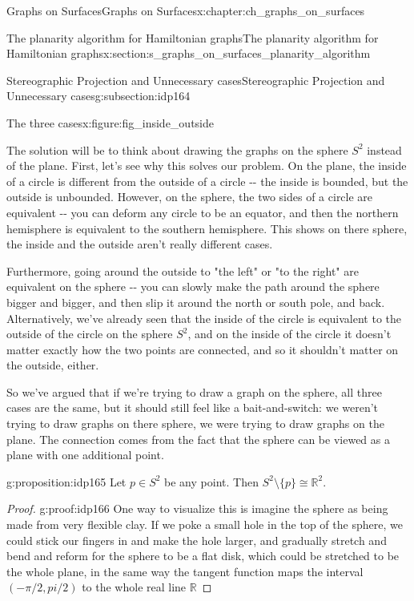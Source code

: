 \documentclass[oneside,10pt,]{book}
\numberwithin{equation}{section}
\newcommand{\reals}{\mathbb{R}}
\begin{document}
\begin{chapterptx}{Graphs on Surfaces}{}{Graphs on Surfaces}{}{}{x:chapter:ch_graphs_on_surfaces}
\begin{sectionptx}{The planarity algorithm for Hamiltonian graphs}{}{The planarity algorithm for Hamiltonian graphs}{}{}{x:section:s_graphs_on_surfaces_planarity_algorithm}
\begin{subsectionptx}{Stereographic Projection and Unnecessary cases}{}{Stereographic Projection and Unnecessary cases}{}{}{g:subsection:idp164}
\begin{figureptx}{The three cases}{x:figure:fig_inside_outside}{}
\begin{image}{0.15}{0.7}{0.15}
{\begin{tikzpicture}[scale=.7]
\end{tikzpicture}
}%
\end{image}%
\tcblower
\end{figureptx}%
The solution will be to think about drawing the graphs on the sphere \(S^2\) instead of the plane.  First, let's see why this solves our problem.  On the plane, the inside of a circle is different from the outside of a circle -{}-{} the inside is bounded, but the outside is unbounded.  However, on the sphere, the two sides of a circle are equivalent -{}-{} you can deform any circle to be an equator, and then the northern hemisphere is equivalent to the southern hemisphere. This shows on there sphere, the inside and the outside aren't really different cases.%
\par
Furthermore, going around the outside to "the left" or "to the right" are equivalent on the sphere -{}-{} you can slowly make the path around the sphere bigger and bigger, and then slip it around the north or south pole, and back.  Alternatively, we've already seen that the inside of the circle is equivalent to the outside of the circle on the sphere \(S^2\), and on the inside of the circle it doesn't matter exactly how the two points are connected, and so it shouldn't matter on the outside, either.%
\par
So we've argued that if we're trying to draw a graph on the sphere, all three cases are the same, but it should still feel like a bait-and-switch: we weren't trying to draw graphs on there sphere, we were trying to draw graphs on the plane.  The connection comes from the fact that the sphere can be viewed as a plane with one additional point.%
\begin{proposition}{}{}{g:proposition:idp165}%
Let \(p\in S^2\) be any point.  Then \(S^2\setminus\{p\}\cong\reals^2\).\end{proposition}
\begin{proof}{}{g:proof:idp166}
One way to visualize this is imagine the sphere as being made from very flexible clay.  If we poke a small hole in the top of the sphere, we could stick our fingers in and make the hole larger, and gradually stretch and bend and reform for the sphere to be a flat disk, which could be stretched to be the whole plane, in the same way the tangent function maps the interval \((-\pi/2, pi/2)\) to the whole real line \(\reals\)%
\par

\end{proof}
\end{subsectionptx}
\end{sectionptx}
\end{chapterptx}
\end{document}
